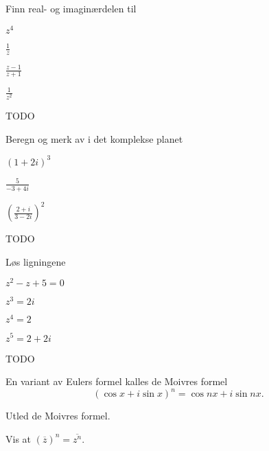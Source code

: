 

\begin{oppgave}
Finn real- og imaginærdelen til
\begin{punkt}
$z^4$ 
\end{punkt}
\begin{punkt}
$\frac{1}{z}$ 
\end{punkt}
\begin{punkt}
$\frac{z-1}{z+1}$ 
\end{punkt}
\begin{punkt}
$\frac{1}{z^2}$ 
\end{punkt}
\end{oppgave}

\begin{losning}
TODO
\end{losning}


\begin{oppgave}
Beregn og merk av i det komplekse planet
\begin{punkt}
$(1+2i)^3$ 
\end{punkt}
\begin{punkt}
$\frac{5}{-3+4i}$  
\end{punkt}
\begin{punkt}
$\left(\frac{2+i}{3-2i}\right)^2$
\end{punkt}
\end{oppgave}

\begin{losning}
TODO
\end{losning}

\begin{oppgave}
Løs ligningene

\begin{punkt}
$z^2-z+5=0$ 
\end{punkt}
\begin{punkt}
$z^3=2i$
\end{punkt}
\begin{punkt}
$z^4=2 $
\end{punkt}
\begin{punkt}
$z^5=2+2i$
\end{punkt}
\end{oppgave}

\begin{losning}
TODO
\end{losning}







\begin{oppgave}
En variant av Eulers formel kalles de Moivres formel
\[
(\cos x + i\sin x)^n=\cos nx + i\sin nx.
\]
\begin{punkt}
Utled de Moivres formel.
\end{punkt}

\begin{punkt}
Vis at $(\overline z)^n=\overline{z^n}$.
\end{punkt}
\end{oppgave}


